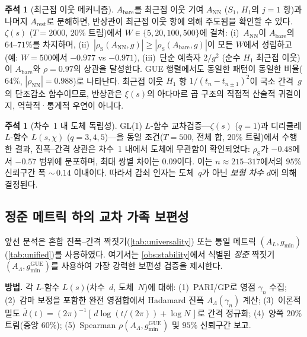 \documentclass[11pt,a4paper]{article}
\theoremstyle{plain}
\theoremstyle{definition}
\newtheorem{remark}[theorem]{주석}
\DeclareMathOperator{\GUE}{GUE}
\newcommand{\La}{\Lambda}
\begin{document}
\begin{remark}[최근접 이웃 메커니즘]\label{rem:nn_mechanism}
$A_{\mathrm{bare}}$를 최근접 이웃 기여
$A_{\mathrm{NN}}$ ($S_1$, $H_1$의 $j{=}1$ 항)과 나머지
$A_{\mathrm{rest}}$로 분해하면, 반상관이 최근접 이웃 항에 의해
주도됨을 확인할 수 있다.
$\zeta(s)$ ($T = 2000$, $20\%$ 트림)에서
$W \in \{5, 20, 100, 500\}$에 걸쳐:
(i)~$A_{\mathrm{NN}}$이 $A_{\mathrm{bare}}$의 $64$--$71\%$를 차지하며,
(ii)~$|\rho_{\mathrm{S}}(A_{\mathrm{NN}}, g)| \ge
|\rho_{\mathrm{S}}(A_{\mathrm{bare}}, g)|$이 모든 $W$에서 성립하고
(예: $W{=}500$에서 $-0.977$ vs $-0.971$),
(iii)~단순 예측자 $2/g^2$ (순수 $H_1$ 최근접 이웃)이
$A_{\mathrm{bare}}$와 $\rho = 0.97$의 상관을 달성한다.
GUE 행렬에서도 동일한 패턴이 동일한 비율($64\%$,
$|\rho_{\mathrm{NN}}|{=}0.988$)로 나타난다.
최근접 이웃 $H_1$ 항 $1/(t_n{-}t_{n\pm 1})^2$이
국소 간격~$g$의 단조감소 함수이므로,
반상관은 $\xi(s)$의 아다마르 곱 구조의 직접적 산술적 귀결이지,
역학적·통계적 우연이 아니다.
\end{remark}

\begin{remark}[차수~1 내 도체 독립성]\label{rem:conductor_indep}
GL(1) $L$-함수 교차검증---$\zeta(s)$ ($q = 1$)과
디리클레 $L$-함수 $L(s,\chi)$ ($q = 3, 4, 5$)---을
동일 조건($T = 500$, 전체 합, $20\%$ 트림)에서 수행한 결과,
진폭--간격 상관은 차수~1 내에서 도체에 무관함이 확인되었다:
$\rho_{\mathrm{S}}$가 $-0.48$에서 $-0.57$ 범위에 분포하며,
최대 쌍별 차이는 $0.09$이다.
이는 $n \approx 215$--$317$에서의 $95\%$ 신뢰구간 폭
${\sim}\,0.14$ 이내이다.
따라서 감쇠 인자는 도체~$q$가 아닌
\emph{보형 차수} $d$에 의해 결정된다.
\end{remark}

\subsection{정준 메트릭 하의 교차 가족 보편성}
\label{ssec:canonical_cross}

앞선 분석은 혼합 진폭--간격 짝짓기(\cref{tab:universality}) 또는
통일 메트릭 $(A_L, g_{\min})$(\cref{tab:unified})를 사용하였다.
여기서는 \cref{obs:stability}에서 식별된 \emph{정준} 짝짓기
$(A_\La, g_{\min}^{\GUE})$를 사용하여 가장 강력한 보편성 검증을 제시한다.

\medskip\noindent\textbf{방법.}\;
각 $L$-함수 $L(s)$(차수~$d$, 도체~$N$)에 대해:
(1)~\textsc{PARI/GP}로 영점 $\gamma_n$ 수집;
(2)~감마 보정을 포함한 완전 영점합에서 Hadamard 진폭 $A_\La(\gamma_n)$ 계산;
(3)~이론적 밀도
$\bar{d}(t) = (2\pi)^{-1}[\,d\log(t/(2\pi)) + \log N\,]$로 간격 정규화;
(4)~양쪽 $20\%$ 트림(중앙 $60\%$);
(5)~Spearman $\rho(A_\La, g_{\min}^{\GUE})$ 및 $95\%$ 신뢰구간 보고.
\end{document}
